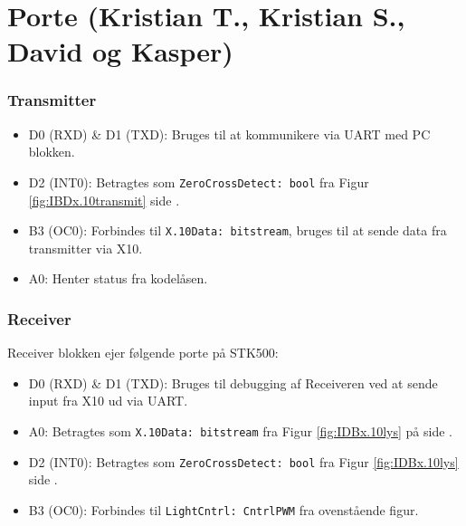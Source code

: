 \section{Porte (Kristian T., Kristian S., David og Kasper)}

\subsubsection{Transmitter}

\begin{itemize}
\item D0 (RXD) \& D1 (TXD): Bruges til at kommunikere via UART med PC blokken.
\item D2 (INT0): Betragtes som \texttt{ZeroCrossDetect: bool} fra Figur \ref{fig:IBDx.10transmit} side \pageref{fig:IBDx.10transmit}.
\item B3 (OC0): Forbindes til \texttt{X.10Data: bitstream}, bruges til at sende data fra transmitter via X10.
\item A0: Henter status fra kodelåsen.
\end{itemize}

\subsubsection{Receiver}

Receiver blokken ejer følgende porte på STK500:
\begin{itemize}
\item D0 (RXD) \& D1 (TXD): Bruges til debugging af Receiveren ved at sende input fra X10 ud via UART.
\item A0: Betragtes som \texttt{X.10Data: bitstream} fra Figur \ref{fig:IDBx.10lys} på side \pageref{fig:IDBx.10lys}.
\item D2 (INT0): Betragtes som \texttt{ZeroCrossDetect: bool} fra Figur \ref{fig:IDBx.10lys} side \pageref{fig:IDBx.10lys}.
\item B3 (OC0): Forbindes til \texttt{LightCntrl: CntrlPWM} fra ovenstående figur.
\end{itemize}

\clearpage